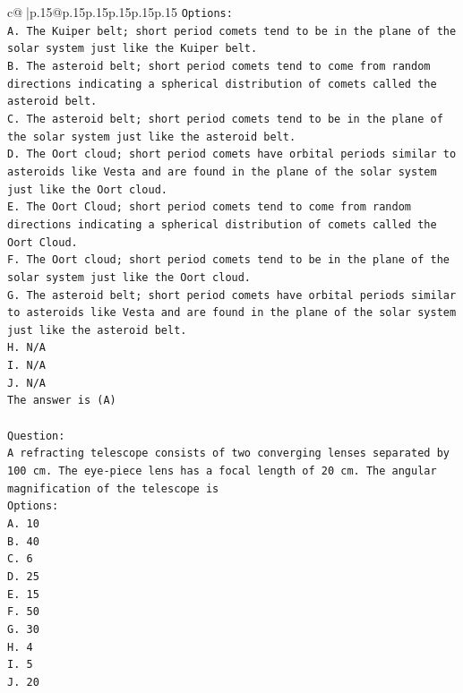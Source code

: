 \documentclass{article}
\begin{document}
{\begin{supertabular}{c@{$\;$}|p{.15\linewidth}@{}p{.15\linewidth}p{.15\linewidth}p{.15\linewidth}p{.15\linewidth}p{.15\linewidth}}
{{{\texttt{Options:} \\
\texttt{A. The Kuiper belt; short period comets tend to be in the plane of the solar system just like the Kuiper belt.} \\
\texttt{B. The asteroid belt; short period comets tend to come from random directions indicating a spherical distribution of comets called the asteroid belt.} \\
\texttt{C. The asteroid belt; short period comets tend to be in the plane of the solar system just like the asteroid belt.} \\
\texttt{D. The Oort cloud; short period comets have orbital periods similar to asteroids like Vesta and are found in the plane of the solar system just like the Oort cloud.} \\
\texttt{E. The Oort Cloud; short period comets tend to come from random directions indicating a spherical distribution of comets called the Oort Cloud.} \\
\texttt{F. The Oort cloud; short period comets tend to be in the plane of the solar system just like the Oort cloud.} \\
\texttt{G. The asteroid belt; short period comets have orbital periods similar to asteroids like Vesta and are found in the plane of the solar system just like the asteroid belt.} \\
\texttt{H. N/A} \\
\texttt{I. N/A} \\
\texttt{J. N/A} \\
\texttt{The answer is (A)} \\
\\ 
\texttt{Question:} \\
\texttt{A refracting telescope consists of two converging lenses separated by 100 cm. The eye{-}piece lens has a focal length of 20 cm. The angular magnification of the telescope is} \\
\texttt{Options:} \\
\texttt{A. 10} \\
\texttt{B. 40} \\
\texttt{C. 6} \\
\texttt{D. 25} \\
\texttt{E. 15} \\
\texttt{F. 50} \\
\texttt{G. 30} \\
\texttt{H. 4} \\
\texttt{I. 5} \\
\texttt{J. 20} \\
}}}
\end{supertabular}}
\end{document}
